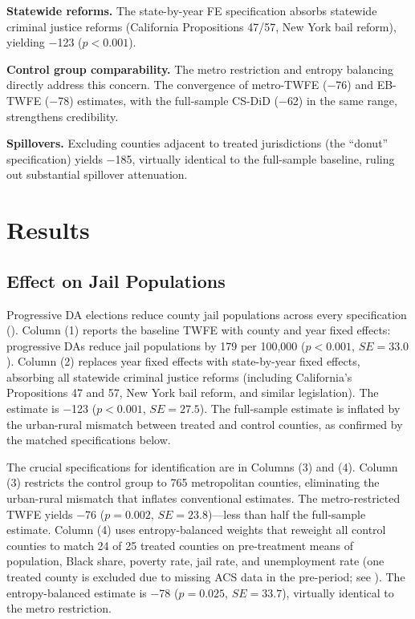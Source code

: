 \documentclass[12pt]{article}
\begin{document}
\textbf{Statewide reforms.} The state-by-year FE specification absorbs statewide criminal justice reforms (California Propositions 47/57, New York bail reform), yielding $-$123 ($p < 0.001$).

\textbf{Control group comparability.} The metro restriction and entropy balancing directly address this concern. The convergence of metro-TWFE ($-$76) and EB-TWFE ($-$78) estimates, with the full-sample CS-DiD ($-$62) in the same range, strengthens credibility.

\textbf{Spillovers.} Excluding counties adjacent to treated jurisdictions (the ``donut'' specification) yields $-$185, virtually identical to the full-sample baseline, ruling out substantial spillover attenuation.


\section{Results}
\label{sec:results}

\subsection{Effect on Jail Populations}

Progressive DA elections reduce county jail populations across every specification (). Column (1) reports the baseline TWFE with county and year fixed effects: progressive DAs reduce jail populations by 179 per 100,000 ($p < 0.001$, $SE = 33.0$). Column (2) replaces year fixed effects with state-by-year fixed effects, absorbing all statewide criminal justice reforms (including California's Propositions 47 and 57, New York bail reform, and similar legislation). The estimate is $-$123 ($p < 0.001$, $SE = 27.5$). The full-sample estimate is inflated by the urban-rural mismatch between treated and control counties, as confirmed by the matched specifications below.

The crucial specifications for identification are in Columns (3) and (4). Column (3) restricts the control group to 765 metropolitan counties, eliminating the urban-rural mismatch that inflates conventional estimates. The metro-restricted TWFE yields $-$76 ($p = 0.002$, $SE = 23.8$)---less than half the full-sample estimate. Column (4) uses entropy-balanced weights that reweight all control counties to match 24 of 25 treated counties on pre-treatment means of population, Black share, poverty rate, jail rate, and unemployment rate (one treated county is excluded due to missing ACS data in the pre-period; see ). The entropy-balanced estimate is $-$78 ($p = 0.025$, $SE = 33.7$), virtually identical to the metro restriction.
\end{document}
